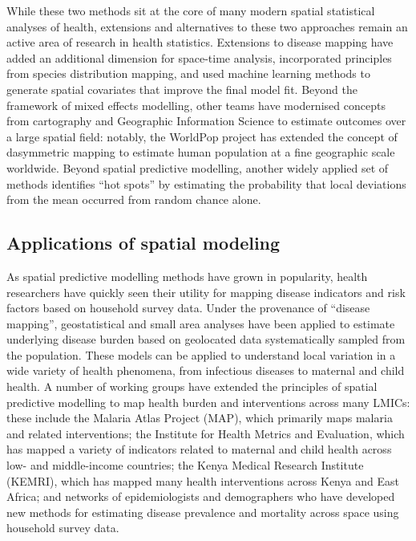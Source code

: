 \documentclass[
]{report}
\begin{document}
While these two methods sit at the core of many modern spatial statistical analyses of health, extensions and alternatives to these two approaches remain an active area of research in health statistics. Extensions to disease mapping have added an additional dimension for space-time analysis,\autocite{Mercer2015} incorporated principles from species distribution mapping,\autocite{Hay2013} and used machine learning methods to generate spatial covariates that improve the final model fit.\autocite{Bhatt2017} Beyond the framework of mixed effects modelling, other teams have modernised concepts from cartography and Geographic Information Science to estimate outcomes over a large spatial field: notably, the WorldPop project has extended the concept of dasymmetric mapping to estimate human population at a fine geographic scale worldwide.\autocite{Tatem2017} Beyond spatial predictive modelling, another widely applied set of methods identifies ``hot spots'' by estimating the probability that local deviations from the mean occurred from random chance alone.\autocite{Kulldorff1997,Banerjee2014}

\hypertarget{applications-of-spatial-modeling}{%
\subsection{Applications of spatial modeling}\label{applications-of-spatial-modeling}}

As spatial predictive modelling methods have grown in popularity, health researchers have quickly seen their utility for mapping disease indicators and risk factors based on household survey data. Under the provenance of ``disease mapping'', geostatistical and small area analyses have been applied to estimate underlying disease burden based on geolocated data systematically sampled from the population.\autocite{Diggle2016} These models can be applied to understand local variation in a wide variety of health phenomena, from infectious diseases\autocite{Pigott2015} to maternal and child health.\autocite{Liang2019} A number of working groups have extended the principles of spatial predictive modelling to map health burden and interventions across many LMICs: these include the Malaria Atlas Project (MAP), which primarily maps malaria and related interventions;\autocite{Weiss2019,Nguyen2019} the Institute for Health Metrics and Evaluation, which has mapped a variety of indicators related to maternal and child health across low- and middle-income countries;\autocite{Osgood-Zimmerman2018} the Kenya Medical Research Institute (KEMRI), which has mapped many health interventions across Kenya and East Africa;\autocite{Maina2019} and networks of epidemiologists and demographers who have developed new methods for estimating disease prevalence and mortality across space using household survey data.\autocite{Diggle2016,Wakefield2020}
\end{document}

